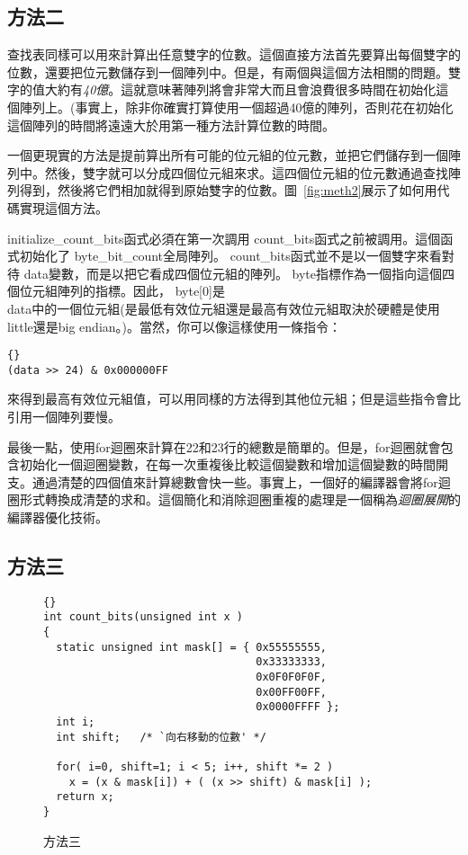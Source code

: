 \subsection{方法二}

查找表同樣可以用來計算出任意雙字的位數。這個直接方法首先要算出每個雙字的位數，還要把位元數儲存到一個陣列中。但是，有兩個與這個方法相關的問題。雙字的值大約有\emph{40億}。這就意味著陣列將會非常大而且會浪費很多時間在初始化這個陣列上。(事實上，除非你確實打算使用一個超過40億的陣列，否則花在初始化這個陣列的時間將遠遠大於用第一種方法計算位數的時間。

一個更現實的方法是提前算出所有可能的位元組的位元數，並把它們儲存到一個陣列中。然後，雙字就可以分成四個位元組來求。這四個位元組的位元數通過查找陣列得到，然後將它們相加就得到原始雙字的位數。圖~\ref{fig:meth2}展示了如何用代碼實現這個方法。

{\code initialize\_count\_bits}函式必須在第一次調用{\code
count\_bits}函式之前被調用。這個函式初始化了{\code
byte\_bit\_count}全局陣列。{\code
count\_bits}函式並不是以一個雙字來看對待{\code
data}變數，而是以把它看成四個位元組的陣列。 {\code
byte}指標作為一個指向這個四個位元組陣列的指標。因此，{\code
byte[0]}是\\{\code
data}中的一個位元組(是最低有效位元組還是最高有效位元組取決於硬體是使用little還是big
endian。)。當然，你可以像這樣使用一條指令：
\begin{lstlisting}[stepnumber=0]{}
(data >> 24) & 0x000000FF
\end{lstlisting}
\noindent 來得到最高有效位元組值，可以用同樣的方法得到其他位元組；但是這些指令會比引用一個陣列要慢。

最後一點，使用{\code for}迴圈來計算在22和23行的總數是簡單的。但是，{\code for}迴圈就會包含初始化一個迴圈變數，在每一次重複後比較這個變數和增加這個變數的時間開支。通過清楚的四個值來計算總數會快一些。事實上，一個好的編譯器會將{\code for}迴圈形式轉換成清楚的求和。這個簡化和消除迴圈重複的處理是一個稱為\emph{迴圈展開}的編譯器優化技術。

\subsection{方法三}

\begin{figure}[t]
\lstset{escapeinside=`',language=Pascal,%
}
\begin{lstlisting}[frame=tlrb]{}
int count_bits(unsigned int x )
{
  static unsigned int mask[] = { 0x55555555,
                                 0x33333333,
                                 0x0F0F0F0F,
                                 0x00FF00FF,
                                 0x0000FFFF };
  int i;
  int shift;   /* `向右移動的位數' */

  for( i=0, shift=1; i < 5; i++, shift *= 2 )
    x = (x & mask[i]) + ( (x >> shift) & mask[i] );
  return x;
}
\end{lstlisting}
\caption{方法三 \label{fig:method3}}
\end{figure}


